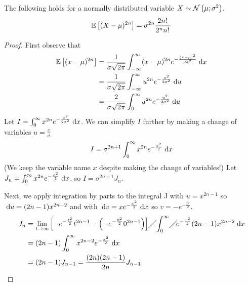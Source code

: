 \documentclass[11pt]{article}
\begin{document}
\begin{prop}
    The following holds for a normally distributed variable
    $X \sim \operatorname{\mathcal{N}}\left(\mu;\sigma^2\right)$.
    \begin{equation*}
        \operatorname{\mathbb{E}}{\left[(X-\mu)^{2n}\right]}
        =
        \sigma^{2n} \frac{2 n !\,}{2^n n !\,}
    \end{equation*}
\end{prop}

\begin{proof}
    \newcommand{\bleh}[1][1]{\frac{#1}{\sigma\sqrt{2\pi}}}
    First observe that
    \begin{align*}
        \E{(x-\mu)^{2n}}
        &= \bleh \infinfint (x - \mu)^{2n} e^{-\frac{(x-\mu)^2}{2\sigma^2}} \intd x \\
        &= \bleh \infinfint u^{2n} e^{-\frac{u^2}{2\sigma^2}} \intd u \\
        &= \bleh[2] \inttoinf_0 u^{2n} e^{-\frac{u^2}{2\sigma^2}} \intd u \\
    \end{align*}
    Let $I = \int^{\infty}_0 x^{2n} e^{-\frac{x^2}{2\sigma^2}} \;\mathrm{d} x$.
    We can simplify $I$ further by making a change of variables
    $u = \frac{x}{\sigma}$
    \begin{equation*}
        I = \sigma^{2n+1} \int^{\infty}_0 x^{2n} e^{-\frac{x^2}{2}} \;\mathrm{d} x
    \end{equation*}
    (We keep the variable name $x$ despite making the change of variables!)
    Let $J_n = \int^{\infty}_0 x^{2n} e^{-\frac{x^2}{2}} \;\mathrm{d} x$,
    so $I = \sigma^{2n+1} J_n$.

    Next, we apply integration by parts to the integral J
    with $u = x^{2n - 1}$ so $\;\mathrm{d} u = (2n - 1)x^{2n - 2}$
    and with $\;\mathrm{d} v = x e^{-\frac{x^2}{2}} \;\mathrm{d} x$
    so $v = - e^{-\frac{x^2}{2}}$.
    \begin{align*}
        J_n
        &= \lim_{t\to\infty} \left[
            - e^{-\frac{t^2}{2}}
            t^{2n - 1}
            - \left(
                - e^{-\frac{0^2}{2}}
                0^{2n - 1}
            \right)
        \right]
        \cancel{-} \int^{\infty}_0 {
            \cancel{-} e^{-\frac{x^2}{2}} (2n - 1) x^{2n - 2} \;\mathrm{d} x
        } \\
        &= (2n - 1) \int^{\infty}_0 { x^{2n-2} e^{-\frac{x^2}{2}} \;\mathrm{d} x } \\
        &= (2n - 1) J_{n-1}
            = \frac{(2n) (2n - 1)}{2n} J_{n-1}
    \end{align*}


\end{proof}
\end{document}
